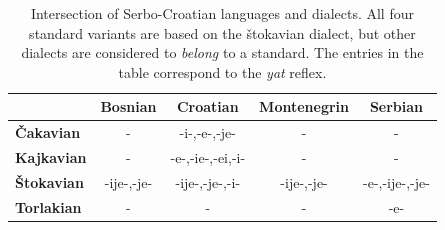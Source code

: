 \begin{table}
\centering
\begin{tabular}{lcccc}
  \hline
              &  \textbf{Bosnian} & \textbf{Croatian} & \textbf{Montenegrin} & \textbf{Serbian}\\
  \hline
 \textbf{Čakavian}  & - & -i-,-e-,-je- & - & -  \\
 \textbf{Kajkavian}  & - & -e-,-ie-,-ei,-i- & - & -  \\
 \textbf{Štokavian}  & -ije-,-je- & -ije-,-je-,-i- & -ije-,-je- & -e-,-ije-,-je-  \\
 \textbf{Torlakian}  & - & - & - & -e-  \\
\hline
\end{tabular}
\caption{Intersection of Serbo-Croatian languages and dialects. All four standard variants 
  are based on the štokavian dialect, but other dialects are considered to \emph{belong} to a 
  standard. The entries in the table 
  correspond to the \emph{yat} reflex.}
\end{table}




